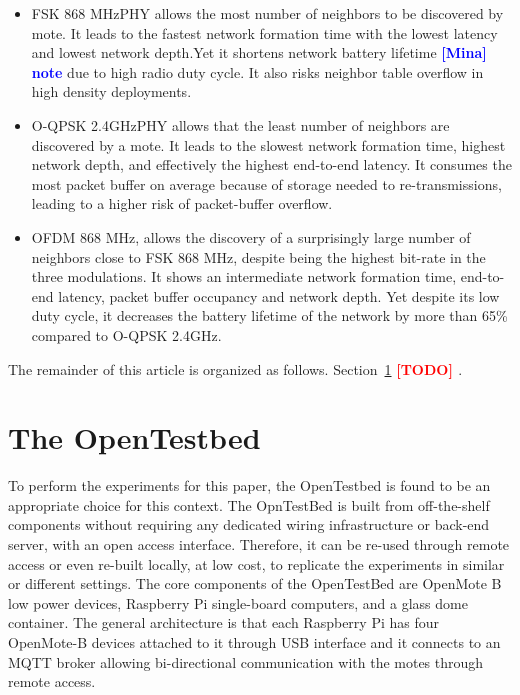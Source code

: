 \documentclass[journal]{IEEEtran}
\newcommand{\fsk}          {FSK 868 MHz}
\newcommand{\oqpsk}        {O-QPSK 2.4GHz}
\newcommand{\ofdm}         {OFDM 868 MHz}
\newcommand{\todo}[1]      {\textbf{\textcolor{red}{[TODO] #1}}}
\newcommand{\mina}[1]      {\textbf{\textcolor{blue}{[Mina] #1}}}
\begin{document}
\begin{itemize}
   \item \fsk PHY allows the most number of neighbors to be discovered by mote. 
    It leads to the fastest network formation time with the lowest latency and lowest network depth.Yet it shortens network battery lifetime \mina{note} due to high radio duty cycle. 
    It also risks neighbor table overflow in high density deployments.
   
   \item \oqpsk PHY allows that the least number of neighbors are discovered by a mote. 
   It leads to the slowest network formation time, highest network depth, and effectively the highest end-to-end latency. 
   It consumes the most packet buffer on average because of storage needed to re-transmissions, leading to a higher risk of packet-buffer overflow. 
   
   \item \ofdm, allows the discovery of a surprisingly large number of neighbors close to \fsk, despite being the highest bit-rate in the three modulations. 
   It shows an intermediate network formation time, end-to-end latency, packet buffer occupancy and network depth.
   Yet despite its low duty cycle, it decreases the battery lifetime of the network by more than 65\% compared to \oqpsk.
\end{itemize}
  

The remainder of this article is organized as follows.
Section~\ref{sec:opentested} \todo{}.

\section{The OpenTestbed}
\label{sec:opentested}

To perform the experiments for this paper, the OpenTestbed \cite{munoz19opentestbed} is found to be an appropriate choice for this context.
The OpnTestBed is built from off-the-shelf components without requiring any dedicated wiring infrastructure or back-end server, with an open access interface. 
Therefore, it can be re-used through remote access or even re-built locally, at low cost, to replicate the experiments in similar or different settings.  
The core components of the OpenTestBed are OpenMote B low power devices, Raspberry Pi single-board computers, and a glass dome container.
The general architecture is that each Raspberry Pi has four OpenMote-B devices attached to it through USB interface and it connects to an MQTT broker allowing bi-directional communication with the motes through remote access. 
\end{document}

